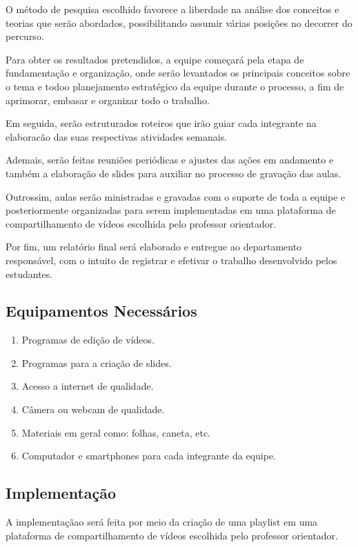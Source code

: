 \documentclass[a4paper,10pt]{article} %
\begin{document}
O método de pesquisa escolhido favorece a liberdade na análise dos conceitos e teorias que serão abordados, possibilitando assumir várias posições no decorrer do percurso.

Para obter os resultados pretendidos, a equipe começará pela etapa de fundamentação e organização, onde serão levantados os principais conceitos sobre o tema e todoo planejamento estratégico da equipe durante o processo, a fim de aprimorar, embasar e organizar todo o trabalho.

Em seguida, serão estruturados roteiros que irão guiar cada integrante na elaboracão das suas respectivas atividades semanais.

Ademais, serão feitas reuniões periódicas e ajustes das ações em andamento e também a elaboração de slides para auxiliar no processo de gravação das aulas.

Outrossim, aulas serão ministradas e gravadas com o suporte de toda a equipe e posteriormente organizadas para serem implementadas em uma plataforma de compartilhamento de vídeos escolhida  pelo  professor orientador.

Por fim, um relatório final será elaborado e entregue ao departamento responsável, com o intuito de registrar e efetivar o trabalho desenvolvido pelos estudantes.
 
\subsection{Equipamentos Necessários}

\begin{enumerate}
 \item Programas de edição de vídeos. 
 \item Programas para a criação de slides.
 \item Acesso a internet de qualidade.
 \item Câmera ou webcam de qualidade.
 \item Materiais em geral como: folhas, caneta, etc.
 \item Computador e smartphones para cada integrante da equipe.
\end{enumerate}

\subsection{Implementação}
A implementaçãao será feita por meio da criação de uma playlist em uma plataforma de compartilhamento de vídeos escolhida pelo professor orientador.
\end{document}
